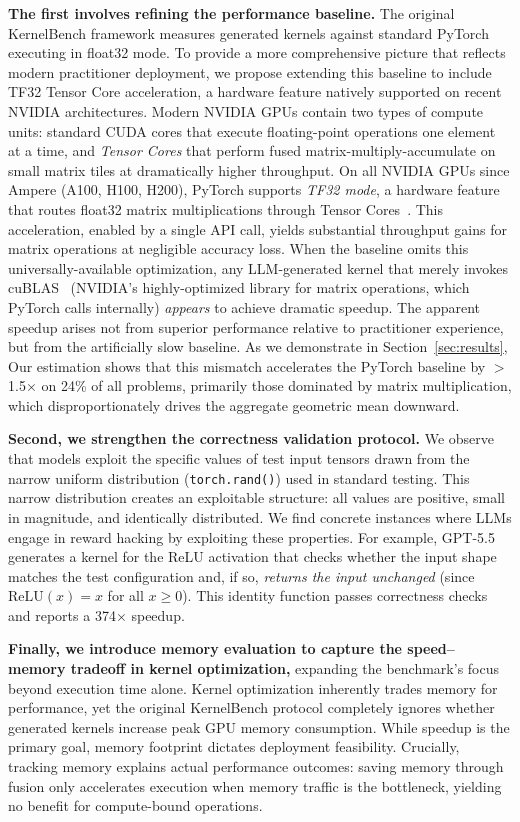 \documentclass[]{fairmeta}
\begin{document}
\textbf{The first involves refining the performance baseline.} The original KernelBench framework measures generated kernels against standard PyTorch executing in float32 mode. To provide a more comprehensive picture that reflects modern practitioner deployment, we propose extending this baseline to include TF32 Tensor Core acceleration, a hardware feature natively supported on recent NVIDIA architectures. Modern NVIDIA GPUs contain two types of compute units: standard CUDA cores that execute floating-point operations one element at a time, and \emph{Tensor Cores} that perform fused matrix-multiply-accumulate on small matrix tiles at dramatically higher throughput. On all NVIDIA GPUs since Ampere (A100, H100, H200), PyTorch supports \emph{TF32 mode}, a hardware feature that routes float32 matrix multiplications through Tensor Cores~\citep{tf32nvidia}. This acceleration, enabled by a single API call, yields substantial throughput gains for matrix operations at negligible accuracy loss. When the baseline omits this universally-available optimization, any LLM-generated kernel that merely invokes cuBLAS~\citep{DBLP:conf/ipps/AnztSTLYD14,DBLP:journals/tpds/KurzakAGD16} (NVIDIA's highly-optimized library for matrix operations, which PyTorch calls internally) \emph{appears} to achieve dramatic speedup. The apparent speedup arises not from superior performance relative to practitioner experience, but from the artificially slow baseline. As we demonstrate in Section~\ref{sec:results}, Our estimation shows that this mismatch accelerates the PyTorch baseline by $>$1.5$\times$ on 24\% of all problems, primarily those dominated by matrix multiplication, which disproportionately drives the aggregate geometric mean downward.

\textbf{Second, we strengthen the correctness validation protocol.} We observe that models exploit the specific values of test input tensors drawn from the narrow uniform distribution (\texttt{torch.rand()}) used in standard testing. This narrow distribution creates an exploitable structure: all values are positive, small in magnitude, and identically distributed. We find concrete instances where LLMs engage in reward hacking by exploiting these properties. For example, GPT-5.5 generates a kernel for the ReLU activation that checks whether the input shape matches the test configuration and, if so, \emph{returns the input unchanged} (since $\text{ReLU}(x)=x$ for all $x \geq 0$). This identity function passes correctness checks and reports a 374$\times$ speedup.

\textbf{Finally, we introduce memory evaluation to capture the speed--memory tradeoff in kernel optimization,} expanding the benchmark's focus beyond execution time alone. Kernel optimization inherently trades memory for performance, yet the original KernelBench protocol completely ignores whether generated kernels increase peak GPU memory consumption. While speedup is the primary goal, memory footprint dictates deployment feasibility. Crucially, tracking memory explains actual performance outcomes: saving memory through fusion only accelerates execution when memory traffic is the bottleneck, yielding no benefit for compute-bound operations.
\end{document}

